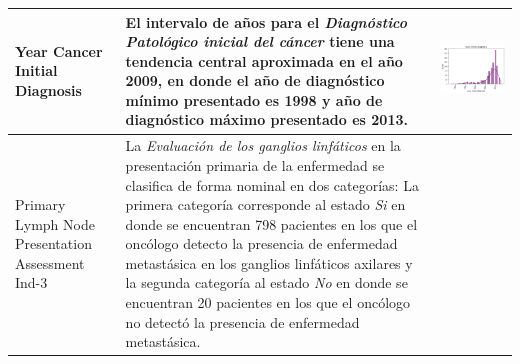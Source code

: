 \begin{table}[!htb]
	\footnotesize
	\begin{threeparttable}
		\begin{tabular}{p{2.5cm} p{7cm} p{6.5cm}} \toprule
			
			Year Cancer Initial Diagnosis
			& El intervalo de años para el \textit{Diagnóstico Patológico inicial del cáncer} tiene una tendencia central aproximada en el año 2009, en donde el año de diagnóstico mínimo presentado es 1998 y año de diagnóstico máximo presentado es 2013.
			
			& \begin{center}\includegraphics[width=1\linewidth]{NOTEBOOK/IMAGENES_DESCRIPTIVAS/21_year_initial_diagnosis}\end{center}
			\\ \hline
			
			Primary Lymph Node Presentation Assessment Ind-3
			& La \textit{Evaluación de los ganglios linfáticos} en la presentación primaria de la enfermedad se clasifica de forma nominal en dos categorías: La primera categoría corresponde al estado \textit{Si} en donde se encuentran 798 pacientes en los que el oncólogo detecto la presencia de enfermedad metastásica en los ganglios linfáticos axilares y la segunda categoría al estado \textit{No} en donde se encuentran 20 pacientes en los que el oncólogo no detectó la presencia de enfermedad metastásica.
			

\end{tabular}
\end{threeparttable}
\end{table}
